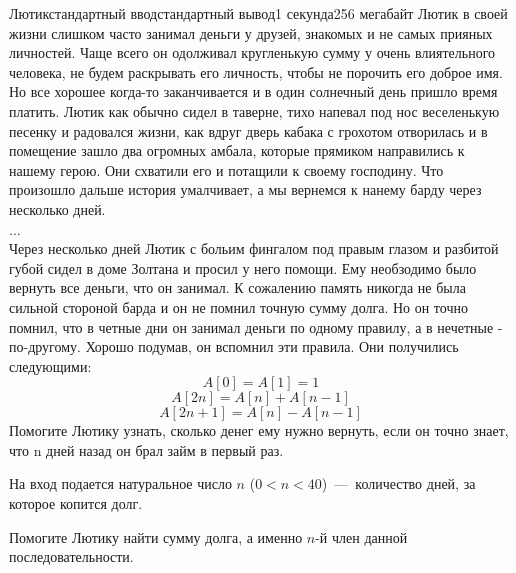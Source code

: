 \begin{problem}{Лютик}{стандартный ввод}{стандартный вывод}{1 секунда}{256 мегабайт}
Лютик в своей жизни слишком часто занимал деньги у друзей, знакомых и не самых прияных личностей. 
Чаще всего он одолживал кругленькую сумму у очень влиятельного человека, не будем раскрывать его личность, чтобы не порочить его доброе имя. 
Но все хорошее когда-то заканчивается и в один солнечный день пришло время платить. Лютик как обычно сидел в таверне, тихо напевал под нос веселенькую песенку и радовался жизни, 
как вдруг дверь кабака с грохотом отворилась и в помещение зашло два огромных амбала, которые прямиком направились к нашему герою. Они схватили его и потащили к своему господину. 
Что произошло дальше история умалчивает, а мы вернемся к нанему барду через несколько дней.   
\\
...
\\ 
Через несколько дней Лютик с больим фингалом под правым глазом и разбитой губой сидел в доме Золтана и просил у него помощи. Ему необзодимо было вернуть все деньги, что он занимал.
К сожалению память никогда не была сильной стороной барда и он не помнил точную сумму долга. 
Но он точно помнил, что в четные дни он занимал деньги по одному правилу, а в нечетные  - по-другому. 
Хорошо подумав, он вспомнил эти правила. Они получились следующими:
\begin{equation*}
A[0]=A[1]=1
\end{equation*}
\begin{equation*}
A[2n]=A[n]+A[n-1]
\end{equation*}
\begin{equation*}
A[2n+1]=A[n]-A[n-1]
\end{equation*}
Помогите Лютику узнать, сколько денег ему нужно вернуть, если он точно знает, что n дней назад он брал займ в первый раз. 

\InputFile
На вход подается натуральное число $n$ ($0 < n < 40$)~---~количество дней, за которое копится долг.

\OutputFile
Помогите Лютику найти сумму долга, а именно $n$-й член данной последовательности.

\Example

\begin{example}
%
\end{example}

\end{problem}

